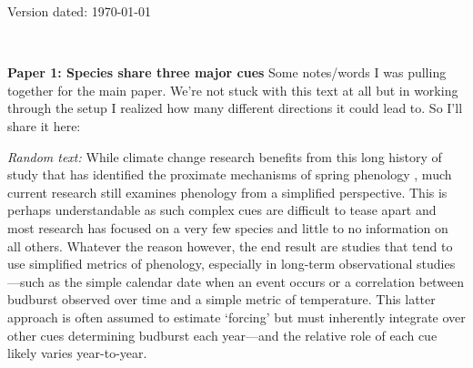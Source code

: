\documentclass[11pt,letterpaper]{article}
\begin{document}
\begin{flushright}
Version dated: \today
\end{flushright}
\thispagestyle{empty}
\bigskip
\medskip
\begin{center}
\\
\vspace{2ex}
\bigskip
\end{center}


{\bf Paper 1: Species share three major cues} %
Some notes/words I was pulling together for the main paper. We're not stuck with this text at all but in working through the setup I realized how many different directions it could lead to. So I'll share it here:

\begin{abstract}
Decades of research on woody species highlight how three major cues shape spring phenological events (e.g., budburst and leafout): forcing (warm temperatures, generally occurring in the late winter and early spring), daylength (photoperiod) and chilling (cool temperatures, generally occurring in the fall and late winter). How pervasive these cues are and whether some species are effectively governed by only one or two cues is a critical area of climate change biology research, as it would shape how complex responses to warming will be. Here we use a global meta-analysis of all published growth chamber studies to test for the relative effects of these three major cues across XX species. We find they almost all show these cues, making climate change responses complex. 
\end{abstract}

\emph{Random text:} While climate change research benefits from this long history of study that has identified the proximate mechanisms of spring phenology \citep{chuinearees}, much current research still examines phenology from a simplified perspective. This is perhaps understandable as such complex cues are difficult to tease apart and most research has focused on a very few species and little to no information on all others. Whatever the reason however, the end result are studies that tend to use simplified metrics of phenology, especially in long-term observational studies---such as the simple calendar date when an event occurs or a correlation between budburst observed over time and a simple metric of temperature. This latter approach is often assumed to estimate `forcing' but must inherently integrate over other cues determining budburst each year---and the relative role of each cue likely varies year-to-year. 
\end{document}
